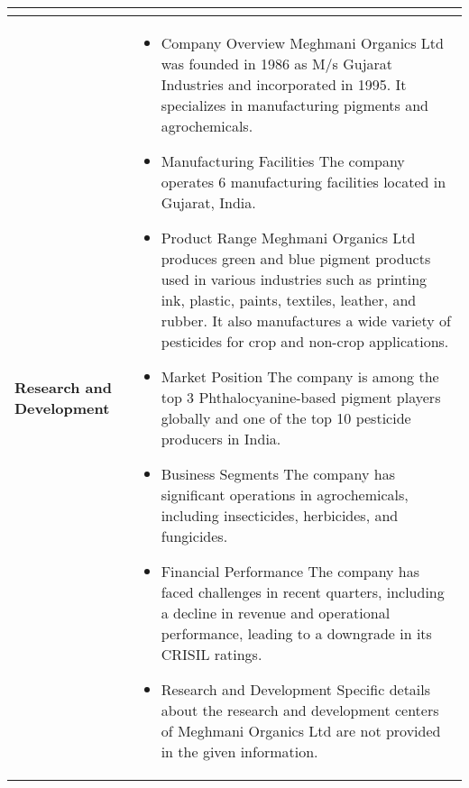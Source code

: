 \documentclass{article}
\begin{document}
\begin{longtable}{|m{3cm}|p{14cm}|}
\begin{itemize}
    \end{itemize} \\
    \hline
    \multirow{5}{*}{\parbox{3cm}{\centering \textbf{Research and Development}}} &
    \begin{itemize}
    \renewcommand\labelitemi{--}
        
        \item Company Overview Meghmani Organics Ltd was founded in 1986 as M/s Gujarat Industries and incorporated in 1995. It specializes in manufacturing pigments and agrochemicals.
        
        \item Manufacturing Facilities The company operates 6 manufacturing facilities located in Gujarat, India.
        
        \item Product Range Meghmani Organics Ltd produces green and blue pigment products used in various industries such as printing ink, plastic, paints, textiles, leather, and rubber. It also manufactures a wide variety of pesticides for crop and non-crop applications.
        
        \item Market Position The company is among the top 3 Phthalocyanine-based pigment players globally and one of the top 10 pesticide producers in India.
        
        \item Business Segments The company has significant operations in agrochemicals, including insecticides, herbicides, and fungicides.
        
        \item Financial Performance The company has faced challenges in recent quarters, including a decline in revenue and operational performance, leading to a downgrade in its CRISIL ratings.
        
        \item Research and Development Specific details about the research and development centers of Meghmani Organics Ltd are not provided in the given information.
        
    \end{itemize} \\
    \hline
\end{longtable}
\end{document}

